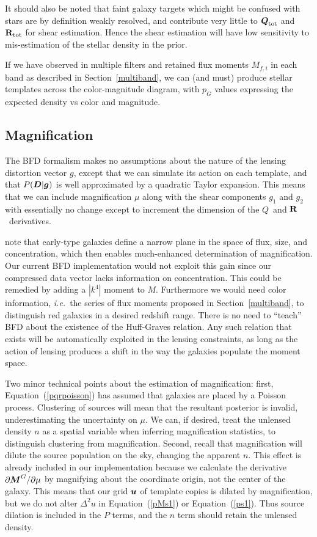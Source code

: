 \documentclass[11pt,preprint,flushrt]{aastex}
\def\eqq#1{Equation~(\ref{#1})}
\newcommand\ie{{\it i.e.\/}}
\newcommand{\vecD}{\mbox{\boldmath $D$}}
\newcommand{\vecg}{\mbox{\boldmath $g$}}
\newcommand{\vecM}{\mbox{\boldmath $M$}}
\newcommand{\vecQ}{\mbox{\boldmath $Q$}}
\newcommand{\vecu}{\mbox{\boldmath $u$}}
\newcommand{\matR}{\mbox{$\bf R$}}
\begin{document}
It should also be noted that faint galaxy targets which might be confused with
stars are by definition weakly resolved, and contribute very little to
$\vecQ_{\rm tot}$ and $\matR_{\rm tot}$ for shear estimation.  Hence
the shear estimation will have low sensitivity to mis-estimation of
the stellar density in the prior.

If we have observed in multiple filters and retained flux moments
$M_{f,i}$ in each band as described in Section~\ref{multiband}, we can
(and must) produce stellar templates across the color-magnitude
diagram, with $p_G$ values expressing the expected density vs color
and magnitude.

\subsection{Magnification}
The BFD formalism makes no assumptions about the nature of the lensing
distortion vector \vecg, except that we can simulate its action on
each template, and that $P(\vecD|\vecg)$ is well
approximated by a quadratic Taylor expansion.  This means that we can
include magnification $\mu$ along with the shear components $g_1$ and
$g_2$ with essentially no change except to increment the dimension of
the \vecQ\ and \matR\ derivatives.

\citet{HuffGraves} note that early-type galaxies define a narrow plane
in the space of flux, size, and concentration, which then enables
much-enhanced determination of magnification.  Our current BFD
implementation would not exploit this gain since our compressed data
vector lacks information on concentration.  This could be remedied by
adding a $|k^4|$ moment to \vecM.  Furthermore we would need color
information, \ie\ the series of flux moments proposed in Section~\ref{multiband},
to distinguish red galaxies in a desired redshift range.  There is no
need to ``teach'' BFD about the 
existence of the Huff-Graves relation.  Any such relation that exists
will be automatically exploited in the lensing constraints, as long as
the action of lensing produces a shift in the way the galaxies
populate the moment space.

Two minor technical points about the estimation of magnification:
first, \eqq{pqrpoisson}  has
assumed that galaxies are placed by a Poisson process.  Clustering of
sources will mean that the resultant posterior is invalid,
underestimating the uncertainty on $\mu.$  
We can, if desired, treat the unlensed density $n$ as a spatial
variable when inferring magnification statistics, to distinguish
clustering from magnification.
Second, recall that magnification will dilute the source population on
the sky, changing the apparent $n.$  This effect is already included
in our implementation because we calculate the derivative
$\partial\vecM^G/\partial\mu$ by magnifying about the coordinate
origin, not the center of the galaxy.  This means that our grid
$\vecu$ of template copies is dilated by magnification, but we do
not alter $\Delta^2u$ in \eqq{pMs1} or \eqq{ps1}.  Thus source
dilation is included in the $P$ terms, and the $n$ term should retain
the unlensed density.
\end{document}
